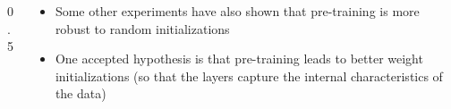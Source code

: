 
\begin{frame}
	\begin{columns}
		\begin{column} {0.5\textwidth}
			\begin{center}
				
			\end{center}
		\end{column}
		
		\begin{column}{0.5\textwidth}
			
			\begin{itemize}[<+->]
				\justifying
				\item Some other experiments have also shown that pre-training is more robust to random initializations
				\item One accepted hypothesis is that pre-training leads to better weight initializations (so that the layers capture the internal characteristics of the data)
			\end{itemize}
			
		\end{column}
		
	\end{columns}
		
\end{frame}

